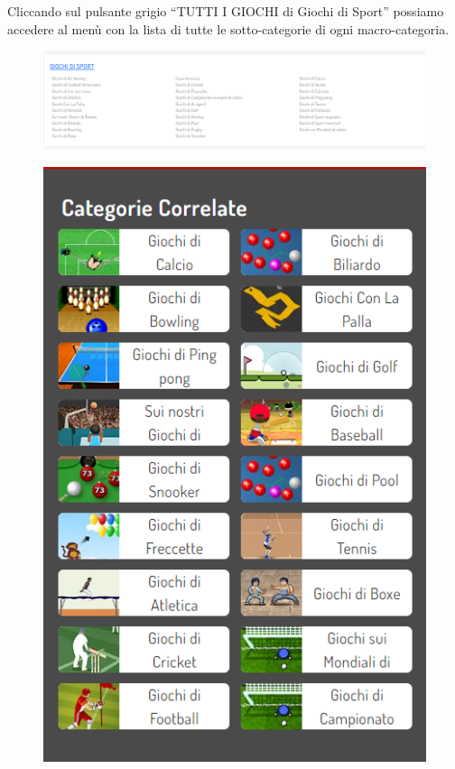 \documentclass[../Report.tex]{subfiles}
\begin{document}
    Cliccando sul pulsante grigio “TUTTI I GIOCHI di Giochi di Sport” possiamo accedere al menù con la lista di tutte le sotto-categorie di ogni macro-categoria. 

    \begin{figure}[H]
        \includegraphics[width=\linewidth]{Assestment11.png}
        \centering
    \end{figure}
    \begin{figure}
        \includegraphics[width=\linewidth]{Assestment12.png}
        \centering
    \end{figure}
\end{document}
